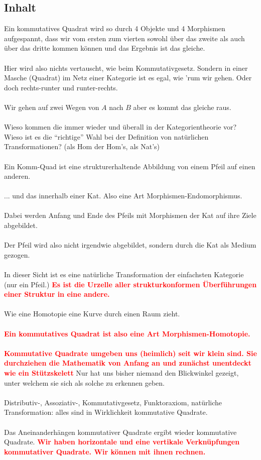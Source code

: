 \documentclass[a4paper]{amsart}
\theoremstyle{definition}
\newcommand{\imporant}[1]{ \textcolor{red}{\textbf{#1}} }
\begin{document}
\subsection*{Inhalt}
Ein kommutatives Quadrat wird so durch 4 Objekte und 4 Morphismen aufgespannt, dass wir vom ersten zum vierten sowohl über das zweite als auch über das dritte kommen können und das Ergebnis ist das gleiche.
\\\\
Hier wird also nichts vertauscht, wie beim Kommutativgesetz. Sondern in einer Masche (Quadrat) im Netz einer Kategorie ist es egal, wie 'rum wir gehen. Oder doch rechts-runter und runter-rechts.
\\\\
Wir gehen auf zwei Wegen von $A$ nach $B$ aber es kommt das gleiche raus.
\\\\
Wieso kommen die immer wieder und überall in der Kategorientheorie vor? Wieso ist es die "`richtige"' Wahl bei der Definition von natürlichen Transformationen? (als Hom der Hom's, als Nat's)
\\\\
Ein Komm-Quad ist eine strukturerhaltende Abbildung von einem Pfeil auf einen anderen.
\\\\
... und das innerhalb einer Kat. Also eine Art Morphismen-Endomorphismus.
\\\\
Dabei werden Anfang und Ende des Pfeils mit Morphismen der Kat auf ihre Ziele abgebildet.
\\\\
Der Pfeil wird also nicht irgendwie abgebildet, sondern durch die Kat als Medium gezogen.
\\\\
In dieser Sicht ist es eine natürliche Transformation der einfachsten Kategorie (nur ein Pfeil.)\imporant{Es ist die Urzelle aller strukturkonformen Überführungen einer Struktur in eine andere.}
\\\\
Wie eine Homotopie eine Kurve durch einen Raum zieht.
\\\\
\imporant{Ein kommutatives Quadrat ist also eine Art Morphismen-Homotopie.}
\\\\
\imporant{Kommutative Quadrate umgeben uns (heimlich) seit wir klein sind. Sie durchziehen die Mathematik von Anfang an und zunächst unentdeckt wie ein Stützskelett} Nur hat uns bisher niemand den Blickwinkel gezeigt, unter welchem sie sich als solche zu erkennen geben.
\\\\
Distributiv-, Assoziativ-, Kommutativgesetz, Funktoraxiom, natürliche Transformation: alles sind
in Wirklichkeit kommutative Quadrate.
\\\\
Das Aneinanderhängen kommutativer Quadrate ergibt wieder kommutative Quadrate. \imporant{Wir haben horizontale und eine vertikale Verknüpfungen kommutativer Quadrate. Wir können mit ihnen rechnen.}
\end{document}

